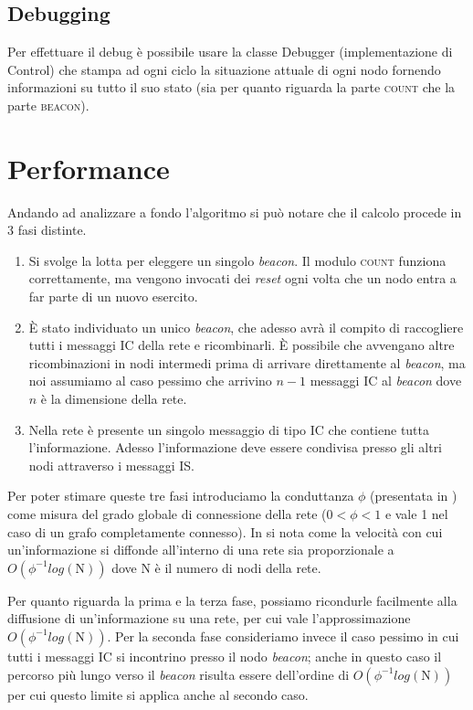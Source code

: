 \documentclass[a4paper,12pt]{article}
\begin{document}
\subsection{Debugging}

Per effettuare il debug \`e possibile usare la classe \textsf{Debugger} (implementazione di \textsf{Control}) che stampa ad ogni ciclo la situazione attuale di ogni nodo fornendo informazioni su tutto il suo stato (sia per quanto riguarda la parte \textsc{count} che la parte \textsc{beacon}).

\section{Performance}
\label{sec:performance}

Andando ad analizzare a fondo l'algoritmo si pu\`o notare che il calcolo procede in 3 fasi distinte.
\begin{enumerate}
\item Si svolge la lotta per eleggere un singolo \emph{beacon}. Il modulo \textsc{count} funziona correttamente, ma vengono invocati dei \emph{reset} ogni volta che un nodo entra a far parte di un nuovo esercito. 
\item \`E stato individuato un unico \emph{beacon}, che adesso avr\`a il compito di raccogliere tutti i messaggi IC della rete e ricombinarli. \`E possibile che avvengano altre ricombinazioni in nodi intermedi prima di arrivare direttamente al \emph{beacon}, ma noi assumiamo al caso pessimo che arrivino $n-1$ messaggi IC al \emph{beacon} dove $n$ \`e la dimensione della rete.
\item Nella rete \`e presente un singolo messaggio di tipo IC che contiene tutta l'informazione. Adesso l'informazione deve essere condivisa presso gli altri nodi attraverso i messaggi IS.
\end{enumerate}

Per poter stimare queste tre fasi introduciamo la conduttanza $\phi$ (presentata in \cite{rif12}) come misura del grado globale di connessione della rete ($0 < \phi < 1$ e vale 1 nel caso di un grafo completamente connesso). In \cite{rif12} si nota come la velocit\`a con cui un'informazione si diffonde all'interno di una rete sia proporzionale a $O(\phi^{-1} log(\mathrm{N}))$ dove N \`e il numero di nodi della rete.

Per quanto riguarda la prima e la terza fase, possiamo ricondurle facilmente alla diffusione di un'informazione su una rete, per cui vale l'approssimazione  $O(\phi^{-1} log(\mathrm{N}))$. Per la seconda fase consideriamo invece il caso pessimo in cui tutti i messaggi IC si incontrino presso il nodo \emph{beacon}; anche in questo caso il percorso pi\`u lungo verso il \emph{beacon} risulta essere dell'ordine di $O(\phi^{-1} log(\mathrm{N}))$ per cui questo limite si applica anche al secondo caso.
\end{document}
